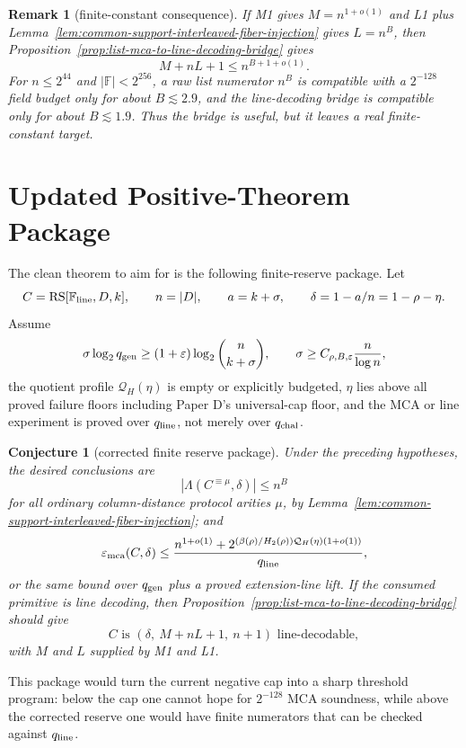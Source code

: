 \documentclass[11pt]{article}
\newtheorem{remark}{Remark}
\newtheorem{conjecture}{Conjecture}
\newcommand{\F}{\mathbb F}
\newcommand{\RS}{\operatorname{RS}}
\newcommand{\qline}{q_{\rm line}}
\newcommand{\qgen}{q_{\rm gen}}
\newcommand{\qchal}{q_{\rm chal}}
\newcommand{\epsmca}{\varepsilon_{\rm mca}}
\newcommand{\Lam}{\Lambda}
\newcommand{\Htwo}{H_2}
\newcommand{\QH}{\mathcal Q_H}
\begin{document}
\begin{remark}[finite-constant consequence]
If M1 gives \(M=n^{1+o(1)}\) and L1 plus
Lemma~\ref{lem:common-support-interleaved-fiber-injection} gives \(L=n^B\), then
Proposition~\ref{prop:list-mca-to-line-decoding-bridge} gives
\[
  M+nL+1\le n^{B+1+o(1)}.
\]
For \(n\le2^{44}\) and \(|\F|<2^{256}\), a raw list numerator \(n^B\) is
compatible with a \(2^{-128}\) field budget only for about \(B\lesssim2.9\), and
the line-decoding bridge is compatible only for about \(B\lesssim1.9\).  Thus the
bridge is useful, but it leaves a real finite-constant target.
\end{remark}

\section{Updated Positive-Theorem Package}
\label{sec:updated-positive-theorem-package}

The clean theorem to aim for is the following finite-reserve package.  Let
\[
  C=\RS[\F_{\rm line},D,k],\qquad n=|D|,
  \qquad a=k+\sigma,
  \qquad \delta=1-a/n=1-\rho-\eta.
\]
Assume
\[
  \sigma\log_2\qgen
  \ge (1+\varepsilon)\log_2\binom n{k+\sigma},
  \qquad
  \sigma\ge C_{\rho,B,\varepsilon}\frac n{\log n},
\]
the quotient profile \(\QH(\eta)\) is empty or explicitly budgeted, \(\eta\) lies
above all proved failure floors including Paper D's universal-cap floor, and the
MCA or line experiment is proved over \(\qline\), not merely over \(\qchal\).

\begin{conjecture}[corrected finite reserve package]
\label{conj:corrected-finite-reserve-package}
Under the preceding hypotheses, the desired conclusions are
\[
  |\Lam(C^{\equiv\mu},\delta)|\le n^B
\]
for all ordinary column-distance protocol arities \(\mu\), by
Lemma~\ref{lem:common-support-interleaved-fiber-injection}; and
\[
  \epsmca(C,\delta)
  \le
  \frac{
    n^{1+o(1)}
    +2^{(\beta(\rho)/\Htwo(\rho))\QH(\eta)(1+o(1))}
  }{\qline},
\]
or the same bound over \(\qgen\) plus a proved extension-line lift.  If the
consumed primitive is line decoding, then
Proposition~\ref{prop:list-mca-to-line-decoding-bridge} should give
\[
  C\text{ is }(\delta,\ M+nL+1,\ n+1)\text{ line-decodable},
\]
with \(M\) and \(L\) supplied by M1 and L1.
\end{conjecture}

This package would turn the current negative cap into a sharp threshold program:
below the cap one cannot hope for \(2^{-128}\) MCA soundness, while above the
corrected reserve one would have finite numerators that can be checked against
\(\qline\).
\end{document}
